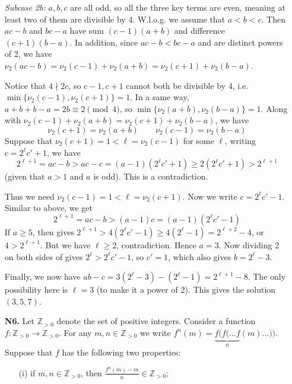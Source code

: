 \documentclass[11pt,a4paper]{article}
\begin{document}
\begin{enumerate}
\emph{Subcase 2b:}  $a, b, c$ are all odd, so all the three key terms are even, meaning at least two of them are divisible by 4. 
W.l.o.g. we assume that $a < b < c$. 
Then $ac - b$ and $bc - a$ have sum $(c - 1)(a + b)$ and difference $(c + 1)(b - a)$. 
In addition, since $ac-b < bc - a$ and are distinct powers of 2, 
we have $\nu_2(ac - b) = \nu_2(c - 1)+\nu_2(a + b) = \nu_2(c + 1) + \nu_2(b - a)$. 

Notice that $4\nmid 2c$, so $c-1, c+1$ cannot both be divisible by 4, i.e. $\min\{\nu_2(c - 1), \nu_2(c + 1)\}=1$. In a same way, $a + b + b - a = 2b\equiv 2\pmod{4}$, so $\min\{\nu_2(a+b), \nu_2(b-a)\}=1$. 
Along with $\nu_2(c - 1)+\nu_2(a + b) = \nu_2(c + 1) + \nu_2(b - a)$, 
we have 
\[
\nu_2(c + 1) = \nu_2(a + b)\qquad \nu_2(c - 1) = \nu_2(b - a)
\]
Suppose that $\nu_2(c + 1) = 1 < \ell = \nu_2(c - 1)$ for some $\ell$, 
writing $c = 2^{\ell}c'+1$, we have 
\[2^{\ell + 1} = ac - b > ac - c = (a - 1)(2^{\ell}c'+1) \ge 2(2^{\ell}c'+1) > 2^{\ell + 1} 
\]
(given that $a > 1$ and $a$ is odd). 
This is a contradiction. 

Thus we need $\nu_2(c - 1) = 1 < \ell =\nu_2(c + 1)$. 
Now we write $c = 2^{\ell}c'-1$. Similar to above, we get 
\begin{equation}\label{eq:n5}
	2^{\ell + 1} = ac - b > (a - 1)c = (a - 1)(2^{\ell}c'-1)
\end{equation}
If $a\ge 5$, then  gives $2^{\ell + 1} > 4(2^{\ell}c'-1)\ge 4(2^{\ell}-1) = 2^{\ell + 2} - 4$, 
or $4 > 2^{\ell + 1}$. 
But we have $\ell\ge 2$, contradiction. 
Hence $a = 3$. 
Now dividing 2 on both sides of  gives $2^{\ell} > 2^{\ell}c'-1$, 
so $c'=1$, which also gives $b = 2^{\ell} - 3$. 

Finally, we now have $ab - c = 3(2^{\ell} - 3) - (2^{\ell} - 1) = 2^{\ell + 1} - 8$. 
The only possibility here is $\ell=3$ (to make it a power of 2). 
This gives the solution $(3, 5, 7)$. 

\item[\textbf{N6.}] Let $\mathbb{Z}_{>0}$ denote the set of positive integers. Consider a function $f: \mathbb{Z}_{>0} \to \mathbb{Z}_{>0}$. For any $m, n \in \mathbb{Z}_{>0}$ we write $f^n(m) = \underbrace{f(f(\ldots f}_{n}(m)\ldots))$. Suppose that $f$ has the following two properties:

\begin{enumerate}
	\item [(i)] if $m, n \in \mathbb{Z}_{>0}$, then $\frac{f^n(m) - m}{n} \in \mathbb{Z}_{>0}$;
	

\end{enumerate}
\end{enumerate}
\end{document}
